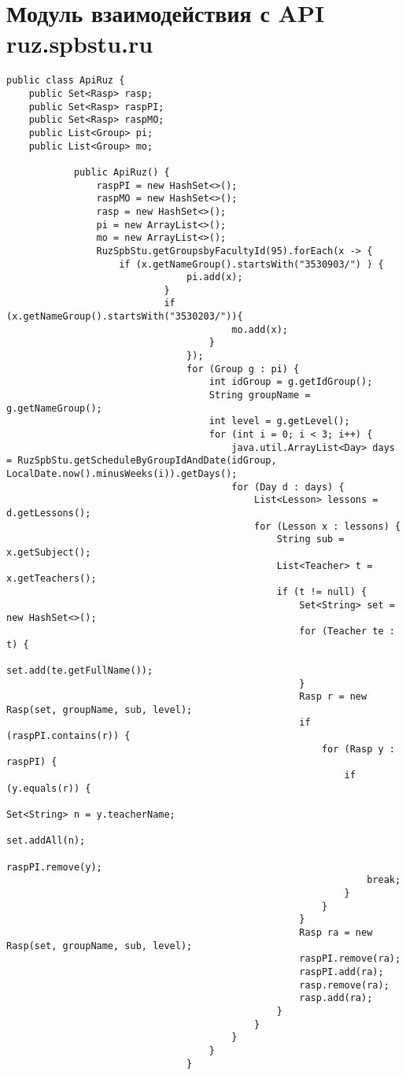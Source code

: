 \chapter{Модуль взаимодействия с API ruz.spbstu.ru}\label{appendix-api}	

\begin{lstlisting}
public class ApiRuz {
	public Set<Rasp> rasp;
	public Set<Rasp> raspPI;
	public Set<Rasp> raspMO;
	public List<Group> pi;
	public List<Group> mo;
	
			public ApiRuz() {
				raspPI = new HashSet<>();
				raspMO = new HashSet<>();
				rasp = new HashSet<>();
				pi = new ArrayList<>();
				mo = new ArrayList<>();
				RuzSpbStu.getGroupsbyFacultyId(95).forEach(x -> {
					if (x.getNameGroup().startsWith("3530903/") ) {
								pi.add(x);
							}
							if (x.getNameGroup().startsWith("3530203/")){
										mo.add(x);
									}
								});
								for (Group g : pi) {
									int idGroup = g.getIdGroup();
									String groupName = g.getNameGroup();
									int level = g.getLevel();
									for (int i = 0; i < 3; i++) {
										java.util.ArrayList<Day> days = RuzSpbStu.getScheduleByGroupIdAndDate(idGroup, LocalDate.now().minusWeeks(i)).getDays();
										for (Day d : days) {
											List<Lesson> lessons = d.getLessons();
											for (Lesson x : lessons) {
												String sub = x.getSubject();
												List<Teacher> t = x.getTeachers();
												if (t != null) {
													Set<String> set = new HashSet<>();
													for (Teacher te : t) {
														set.add(te.getFullName());
													}
													Rasp r = new Rasp(set, groupName, sub, level);
													if (raspPI.contains(r)) {
														for (Rasp y : raspPI) {
															if (y.equals(r)) {
																Set<String> n = y.teacherName;
																set.addAll(n);
																raspPI.remove(y);
																break;
															}
														}
													}
													Rasp ra = new Rasp(set, groupName, sub, level);
													raspPI.remove(ra);
													raspPI.add(ra);
													rasp.remove(ra);
													rasp.add(ra);
												}
											}
										}
									}
								}
								

\end{lstlisting}
